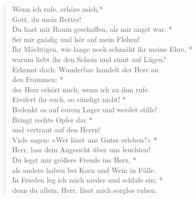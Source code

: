 \begin{verse}
 

 
 Wenn ich rufe, erhöre mich,*\\
Gott, du mein Retter! \\
\vin Du hast mir Raum  geschaffen, als mir angst war. * \\
\vin Sei mir gnädig und hör auf mein Flehen!\\
 Ihr Mächtigen, wie lange noch schmäht ihr meine Ehre, *\\
 warum liebt ihr den Schein und sinnt auf Lügen? \\
\vin Erkennt doch: Wunderbar handelt der Herr an\\ \vin den Frommen; *\\
\vin der Herr erhört mich, wenn ich zu ihm rufe.\\
Ereifert ihr euch, so sündigt nicht! *\\
 Bedenkt es auf eurem Lager und werdet stille! \\
\vin Bringt rechte Opfer dar *\\
\vin und vertraut auf den Herrn! \\
 Viele sagen: «Wer lässt uns Gutes erleben?» *\\
 Herr, lass dein Angesicht über uns leuchten! \\
\vin Du legst mir größere Freude ins Herz, *\\
\vin als andere haben bei Korn und Wein in Fülle.\\
 In Frieden leg ich mich nieder und schlafe ein; *\\
 denn du allein, Herr, lässt mich sorglos ruhen. 


\end{verse}


